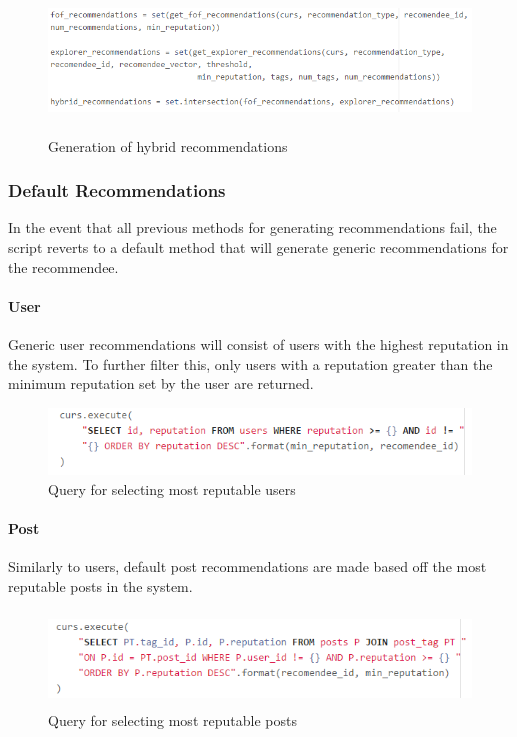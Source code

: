 \begin{figure}[H]
\centering
\includegraphics[height=1.5in]{Images/Implementation/HybridRecommendations}
\caption{Generation of hybrid recommendations}
\label{fig:HybridRecommendations}
\end{figure}

\subsubsection{Default Recommendations}
In the event that all previous methods for generating recommendations fail, the script reverts to a default method that will generate generic recommendations for the recommendee. 

\paragraph{User} Generic user recommendations will consist of users with the highest reputation in the system. To further filter this, only users with a reputation greater than the minimum reputation set by the user are returned.

\begin{figure}[H]
\centering
\includegraphics[height=0.7in]{Images/Implementation/DefaultUsers}
\caption{Query for selecting most reputable users}
\label{fig:DefaultUsers}
\end{figure}

\paragraph{Post}
Similarly to users, default post recommendations are made based off the most reputable posts in the system.

\begin{figure}[H]
\centering
\includegraphics[height=1in]{Images/Implementation/DefaultPosts}
\caption{Query for selecting most reputable posts}
\label{fig:DefaultPosts}
\end{figure}

